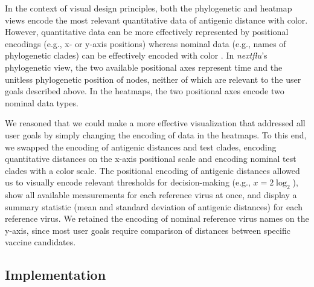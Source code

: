 \documentclass[utf8]{FrontiersinHarvard} %
\begin{document}
In the context of visual design principles, both the phylogenetic and heatmap views encode the most relevant quantitative data of antigenic distance with color.
However, quantitative data can be more effectively represented by positional encodings (e.g., x- or y-axis positions) whereas nominal data (e.g., names of phylogenetic clades) can be effectively encoded with color \citep{Mackinlay1986}.
In \emph{nextflu}'s phylogenetic view, the two available positional axes represent time and the unitless phylogenetic position of nodes, neither of which are relevant to the user goals described above.
In the heatmaps, the two positional axes encode two nominal data types.

We reasoned that we could make a more effective visualization that addressed all user goals by simply changing the encoding of data in the heatmaps.
To this end, we swapped the encoding of antigenic distances and test clades, encoding quantitative distances on the x-axis positional scale and encoding nominal test clades with a color scale.
The positional encoding of antigenic distances allowed us to visually encode relevant thresholds for decision-making (e.g., $x = 2\log_{2}$), show all available measurements for each reference virus at once, and display a summary statistic (mean and standard deviation of antigenic distances) for each reference virus.
We retained the encoding of nominal reference virus names on the y-axis, since most user goals require comparison of distances between specific vaccine candidates.

\subsection{Implementation}
\end{document}
